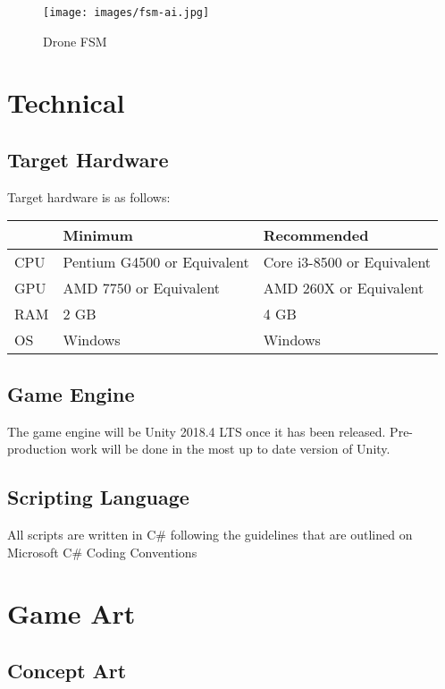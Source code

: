 \documentclass[11pt]{report}
\begin{document}
\begin{figure}[h!]
	\texttt{[image: images/fsm-ai.jpg]}
	\caption{Drone FSM}
\end{figure}

\chapter{Technical}

\section{Target Hardware}

Target hardware is as follows:

\begin{center}
    \begin{tabular}{|l|l|l|}
        \hline
        & Minimum & Recommended \\ \hline
        CPU & Pentium G4500 or Equivalent & Core i3-8500 or Equivalent \\ \hline
        GPU & AMD 7750 or Equivalent & AMD 260X or Equivalent \\ \hline
        RAM & 2 GB & 4 GB \\ \hline
        OS & Windows & Windows \\
        \hline
    \end{tabular}
\end{center}

\section{Game Engine}

The game engine will be Unity 2018.4 LTS once it has been released. Pre-production work will be done in the most up to date version of Unity.

\section{Scripting Language}

All scripts are written in C\# following the guidelines that are outlined on Microsoft C\# Coding Conventions

\chapter{Game Art}

\section{Concept Art}
\end{document}
